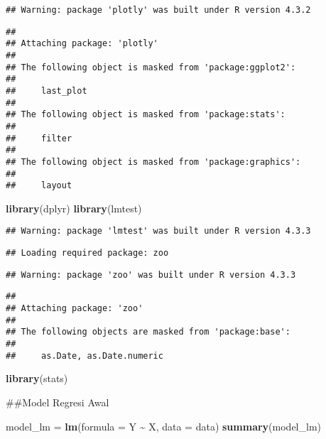 \documentclass[
]{article}
\newenvironment{Shaded}{\begin{snugshade}}{\end{snugshade}}
\newcommand{\AttributeTok}[1]{\textcolor[rgb]{0.13,0.29,0.53}{#1}}
\newcommand{\FunctionTok}[1]{\textcolor[rgb]{0.13,0.29,0.53}{\textbf{#1}}}
\newcommand{\NormalTok}[1]{#1}
\newcommand{\OtherTok}[1]{\textcolor[rgb]{0.56,0.35,0.01}{#1}}
\newcommand{\SpecialCharTok}[1]{\textcolor[rgb]{0.81,0.36,0.00}{\textbf{#1}}}
\begin{document}
\begin{verbatim}
## Warning: package 'plotly' was built under R version 4.3.2
\end{verbatim}

\begin{verbatim}
## 
## Attaching package: 'plotly'
## 
## The following object is masked from 'package:ggplot2':
## 
##     last_plot
## 
## The following object is masked from 'package:stats':
## 
##     filter
## 
## The following object is masked from 'package:graphics':
## 
##     layout
\end{verbatim}

\begin{Shaded}
\begin{Highlighting}[]
\FunctionTok{library}\NormalTok{(dplyr)}
\FunctionTok{library}\NormalTok{(lmtest)}
\end{Highlighting}
\end{Shaded}

\begin{verbatim}
## Warning: package 'lmtest' was built under R version 4.3.3
\end{verbatim}

\begin{verbatim}
## Loading required package: zoo
\end{verbatim}

\begin{verbatim}
## Warning: package 'zoo' was built under R version 4.3.3
\end{verbatim}

\begin{verbatim}
## 
## Attaching package: 'zoo'
## 
## The following objects are masked from 'package:base':
## 
##     as.Date, as.Date.numeric
\end{verbatim}

\begin{Shaded}
\begin{Highlighting}[]
\FunctionTok{library}\NormalTok{(stats)}
\end{Highlighting}
\end{Shaded}

\#\#Model Regresi Awal

\begin{Shaded}
\begin{Highlighting}[]
\NormalTok{model\_lm }\OtherTok{=} \FunctionTok{lm}\NormalTok{(}\AttributeTok{formula =}\NormalTok{ Y }\SpecialCharTok{\textasciitilde{}}\NormalTok{ X, }\AttributeTok{data =}\NormalTok{ data)}
\FunctionTok{summary}\NormalTok{(model\_lm)}
\end{Highlighting}
\end{Shaded}
\end{document}
